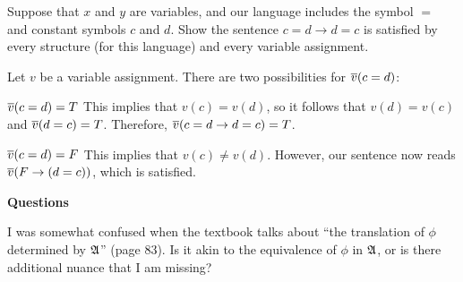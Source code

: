 \documentclass[english, 12pt]{amsart}
\begin{document}
\setlength{\headheight}{13.0pt}
\setlength{\footskip}{15.0pt}



\begin{problem}
  Suppose that $x$ and $y$ are variables, and our language
  includes the symbol $=$ and constant symbols $c$ and $d$.
  Show the sentence $c = d \to d = c$ is satisfied by every
  structure (for this language) and every variable assignment.

  \begin{Answer}
    Let $v$ be a variable assignment.
    There are two possibilities for $\overline{v}(c=d)$:
    \begin{enumroman}
      \item $\overline{v}(c=d) = T$
        This implies that $v(c) = v(d)$, so
        it follows that $v(d) = v(c)$
        and $\overline{v}(d=c) = T$.
        Therefore, $\overline{v}(c=d \to d=c) = T$.
      \item $\overline{v}(c=d) = F$
        This implies that $v(c) \neq v(d)$.
        However, our sentence now reads
        $\overline{v}(F \to (d=c))$,
        which is satisfied.
    \end{enumroman}
  \end{Answer}
\end{problem}

\step
  \begin{center}\textbf{Questions} \end{center}

  \step
  I was somewhat confused when the textbook talks about
  ``the translation of $\phi$ determined by $\mathfrak{A}$''
  (page 83).
  Is it akin to the equivalence of $\phi$ in $\mathfrak{A}$,
  or is there additional nuance that I am missing?

\bigskip
\end{document}
